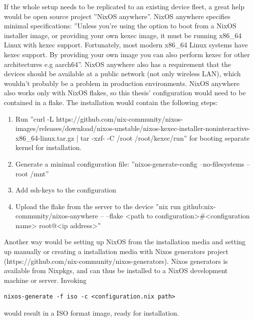 If the whole setup needs to be replicated to an existing device fleet,
a great help would be open source project ''NixOS anywhere''. NixOS
anywhere specifies minimal specifications: ''Unless you're using the
option to boot from a NixOS installer image, or providing your own
kexec image, it must be running x86\_64 Linux with kexec
support. Fortunately, most modern x86\_64 Linux systems have kexec
support. By providing your own image you can also perform kexec for
other architectures e.g aarch64''. NixOS anywhere also has a
requirement that the devices should be available at a public network
(not only wireless LAN), which wouldn't probably be a problem in
production environments. NixOS anywhere also works only with NixOS
flakes, so this thesis' configuration would need to be contained in a
flake. \cite{githubGitHubNixcommunitynixosanywhere}
The installation would contain the following steps:
\begin{enumerate}
  \item Run ''curl -L
    https://github.com/nix-community/nixos-images/releases/download/nixos-unstable/nixos-kexec-installer-noninteractive-x86\_64-linux.tar.gz
    | tar -xzf- -C /root /root/kexec/run'' for booting separate kernel
    for installation.
  \item Generate a minimal configuration file: ''nixos-generate-config
    --no-filesystems --root /mnt''
  \item Add ssh-keys to the configuration
  \item Upload the flake from the server to the device ''nix run
    github:nix-community/nixos-anywhere -- --flake <path to
    configuration>#<configuration name> root@<ip address>''
\end{enumerate}
Another way would be setting up NixOS from the installation media and
setting up manually or creating a installation media with Nixos
generators project
(https://github.com/nix-community/nixos-generators). Nixos generators
is available from Nixpkgs, and can thus be installed to a NixOS
development machine or server. Invoking
\begin{lstlisting}
nixos-generate -f iso -c <configuration.nix path>
\end{lstlisting}
would result in a ISO format image, ready for
installation. \cite{githubGitHubNixcommunitynixosanywhere}
